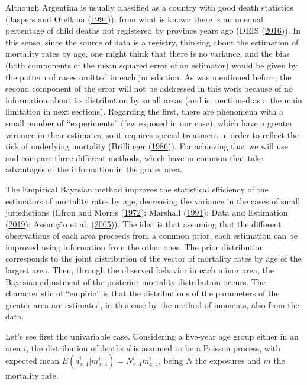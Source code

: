\documentclass[12pt,]{article}
\begin{document}
Although Argentina is usually classified as a country with good death
statistics (Jaspers and Orellana
(\protect\hyperlink{ref-JaspersOrellana1994}{1994})), from what is known
there is an unequal percentage of child deaths not registered by
province years ago (DEIS (\protect\hyperlink{ref-DEIS2016}{2016})). In
this sense, since the source of data is a registry, thinking about the
estimation of mortality rates by age, one might think that there is no
variance, and the bias (both components of the mean squared error of an
estimator) would be given by the pattern of cases omitted in each
jurisdiction. As was mentioned before, the second component of the error
will not be addressed in this work because of no information about its
distribution by small areas (and is mentioned as a the main limitation
in next sections). Regarding the first, there are phenomena with a small
number of ``experiments'' (few exposed in our case), which have a
greater variance in their estimates, so it requires special treatment in
order to reflect the risk of underlying mortality (Brillinger
(\protect\hyperlink{ref-Brillinger1986}{1986})). For achieving that we
will use and compare three different methods, which have in common that
take advantages of the information in the grater area.

The Empirical Bayesian method improves the statistical efficiency of the
estimators of mortality rates by age, decreasing the variance in the
cases of small jurisdictions (Efron and Morris
(\protect\hyperlink{ref-Efron1972}{1972}); Marshall
(\protect\hyperlink{ref-Marshall1991}{1991}); Data and Estimation
(\protect\hyperlink{ref-Longford2005}{2019}); Assunção et al.
(\protect\hyperlink{ref-Assuncao2005}{2005})). The idea is that assuming
that the different observations of each area proceeds from a common
prior, each estimation can be improved using information from the other
ones. The prior distribution corresponds to the joint distribution of
the vector of mortality rates by age of the largest area. Then, through
the observed behavior in each minor area, the Bayesian adjustment of the
posterior mortality distribution occurs. The characteristic of
``empiric'' is that the distributions of the parameters of the greater
area are estimated, in this case by the method of moments, also from the
data.

Let's see first the univariable case. Considering a five-year age group
either in an area \(i\), the distribution of deaths \(d\) is assumed to
be a Poisson process, with expected mean
\(E(d_{x, 4} ^ {i}|{m_{x,4}^{i} }) = N_{x, 4}^{i} m_{x, 4}^{i}\), being
\(N\) the exposures and \(m\) the mortality rate.
\end{document}
